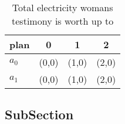 \documentclass[a4paper]{article}
\begin{document}
\begin{table}
\begin{adjustbox}{width=0.6\columnwidth}
\begin{tabular}{|l|l|l|l|}
\hline
\textbf{plan} & \multicolumn{1}{c|}{\textbf{0}} & \multicolumn{1}{c|}{\textbf{1}} & \multicolumn{1}{c|}{\textbf{2}} \\ \hline
\textbf{$a_0$}  & (0,0) & (1,0) & (2,0) \\ \hline
\textbf{$a_1$}  & (0,0) & (1,0) & (2,0) \\ \hline
\end{tabular}
\end{adjustbox}
\caption{Total electricity womans testimony is worth up to
}
\end{table}

\subsection{SubSection}
\end{document}
